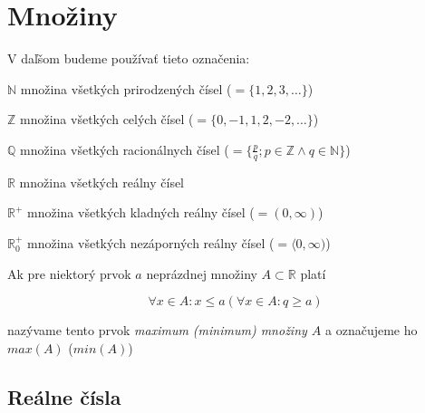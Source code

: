 \chapter{Množiny}%

V daľšom budeme používať tieto označenia:

$\mathbb{N}$ množina všetkých prirodzených čísel ($= \{ 1, 2, 3, \ldots \}$)

$\mathbb{Z}$ množina všetkých celých čísel ($= \{ 0, -1, 1, 2, -2, \ldots \}$)

$\mathbb{Q}$ množina všetkých racionálnych čísel
  ($= \{ \frac{p}{q}; p \in \mathbb{Z} \land q \in \mathbb{N} \}$)

$\mathbb{R}$ množina všetkých reálny čísel

$\mathbb{R}^+$ množina všetkých kladných reálny čísel ($= ( 0, \infty )$)

$\mathbb{R}^+_0$ množina všetkých nezáporných reálny čísel
  ($= \langle 0, \infty )$)

Ak pre niektorý prvok $a$ neprázdnej množiny $A \subset \mathbb{R}$ platí

$$\forall x \in A : x \leq a (\forall x \in A: q \geq a)$$

nazývame tento prvok \textit{maximum (minimum) množiny $A$} a označujeme ho
$max(A)$ ($min(A)$)

\section{Reálne čísla}


